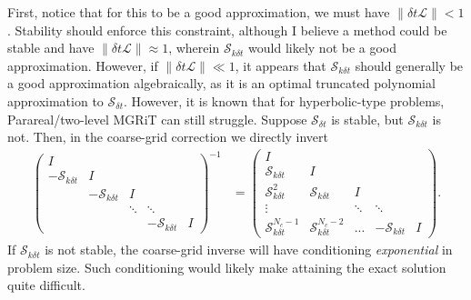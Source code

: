 \documentclass[a4paper,12pt]{article}
\begin{document}
First, notice that for this to be a good approximation, we must have $\|\delta t\mathcal{L}\| < 1$. Stability should enforce this constraint,
although I believe a method could be stable and have $\|\delta t\mathcal{L}\| \approx 1$, wherein $\mathcal{S}_{k\delta t}$ would likely not
be a good approximation. However, if $\|\delta t\mathcal{L}\| \ll 1$, it appears that $\mathcal{S}_{k\delta t}$ should generally be a good
approximation algebraically, as it is an optimal truncated polynomial approximation to $\mathcal{S}_{\delta t}$. However, it is known
that for hyperbolic-type problems, Parareal/two-level MGRiT can still struggle. Suppose $\mathcal{S}_{\delta t}$ is stable, but
$\mathcal{S}_{k\delta t}$ is not. Then, in the coarse-grid correction we directly invert
%
\begin{align}\label{eq:sinv}
\begin{pmatrix} 
I \\ -\mathcal{S}_{k\delta t} & I \\ & -\mathcal{S}_{k\delta t} & I \\ && \ddots & \ddots \\ & & & -\mathcal{S}_{k\delta t} & I\end{pmatrix}^{-1}
	& = \begin{pmatrix}
I \\ \mathcal{S}_{k\delta t} & I \\ \mathcal{S}_{k\delta t}^2 & \mathcal{S}_{k\delta t} & I \\ \vdots && \ddots & \ddots \\ 
	\mathcal{S}_{k\delta t}^{N_c-1} &\mathcal{S}_{k\delta t}^{N_c-2} & ... & -\mathcal{S}_{k\delta t} & I\end{pmatrix}.
\end{align}
%
If $\mathcal{S}_{k\delta t}$ is not stable, the coarse-grid inverse will have conditioning \textit{exponential} in problem size. Such
conditioning would likely make attaining the exact solution quite difficult. 
\end{document}
